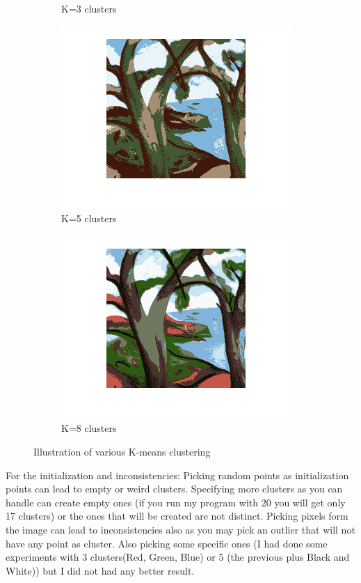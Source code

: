 \begin{figure}[ht]
\begin{subfigure}[b]{0.5\linewidth}
    \caption{K=3 clusters}
    \vspace{4ex}
  \end{subfigure} 
  \begin{subfigure}[b]{0.5\linewidth}
    \centering
    \includegraphics[width=0.75\linewidth]{figures/kmeans5.png}
    \caption{K=5 clusters} 
  \end{subfigure}%
  \begin{subfigure}[b]{0.5\linewidth}
    \centering
    \includegraphics[width=0.75\linewidth]{figures/kmeans8.png} 
    \caption{K=8 clusters} 
  \end{subfigure} 
  \caption{Illustration of various K-means clustering}
\end{figure}

For the initialization and inconsistencies:
Picking random points as initialization points can lead to empty or weird clusters. Specifying
more clusters as you can handle can create empty ones (if you run my program with 20 you will get
only 17 clusters) or the ones that will be created are not distinct. Picking pixels form the image
can lead to inconsistencies also as you may pick an outlier that will not have any point as cluster.
Also picking some specific ones (I had done some experiments with 3 clusters(Red, Green, Blue) or 5
(the previous plus Black and White)) but I did not had any better result. 

